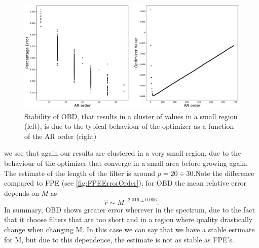 \documentclass[twocolumn,showpacs,preprintnumbers,nofootinbib,prd,
superscriptaddress,10pt]{revtex4-1}
\begin{document}
\begin{figure}[H]
    \centering
    \includegraphics[width = \linewidth]{Images/NormalPSD/OBDoptimizer.pdf}
    \caption{Stability of OBD, that results in a cluster of values in a small region (left), is due to the typical behaviour of the optimizer as a function of the AR order (right)}
       \label{fig:OBDErrorOrder}
\end{figure}we see that again our results are clustered in a very small region, due to the behaviour of the optimizer that converge in a small area before growing again. The estimate of the length of the filter is around $p = 20 \div 30$.Note the difference compared to FPE (see \ref{fig:FPEErrorOrder}); for OBD the mean relative error depends on $M$ as
\begin{equation}
    \hat r \sim M ^ {-2.016 \pm 0.006}.
\end{equation}
In summary, OBD shows greater error wherever in the spectrum, due to the fact that it choose filters that are too short and in a region where quality drastically change when changing M. In this case we can say that we have a stable estimate for M, but due to this dependence, the estimate is not as stable as FPE's. 
\end{document}
